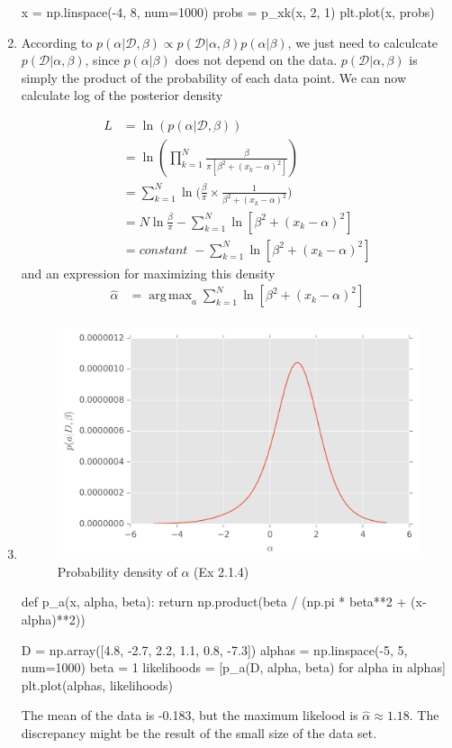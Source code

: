 \documentclass{article}
\DeclareMathOperator*{\argmax}{arg\,max}
\begin{document}
\begin{enumerate}
\begin{python}
x = np.linspace(-4, 8, num=1000)
probs = p_xk(x, 2, 1)
plt.plot(x, probs)
\end{python}
\item 
According to $p(\alpha | \mathcal{D}, \beta) \propto p(\mathcal{D} | \alpha, \beta)p(\alpha|\beta)$, we just need to calculcate  $p(\mathcal{D} | \alpha, \beta)$, since $p(\alpha|\beta)$ does not depend on the data. $p(\mathcal{D} | \alpha, \beta)$ is simply the product of the probability of each data point. We can now calculate log of the posterior density 

\begin{align*}
L &= \ln(p(\alpha | \mathcal{D}, \beta)) \\
&= \ln(\prod_{k=1}^N \frac{\beta}{\pi[\beta^2+(x_k - \alpha)^2]}) \\
&= \sum_{k=1}^N \ln\bigg(\frac{\beta}{\pi}\times\frac{1}{\beta^2+(x_k - \alpha)^2}\bigg) \\
&= N\ln\frac{\beta}{\pi} - \sum_{k=1}^N \ln[\beta^2+(x_k - \alpha)^2] \\
&= \textit{constant } - \sum_{k=1}^N \ln[\beta^2+(x_k - \alpha)^2]
\end{align*}
and an expression for maximizing this density
\begin{align*}
\hat{\alpha} &= \argmax_a \sum_{k=1}^N \ln[\beta^2+(x_k - \alpha)^2]\\
\end{align*}
\item 
\begin{figure}[H]
\centering
\includegraphics[width=.6\textwidth]{images/prob_a.png}
\caption{Probability density of $\alpha$ (Ex 2.1.4)}
\end{figure}
\begin{python}
def p_a(x, alpha, beta):
    return np.product(beta / (np.pi * beta**2 + (x-alpha)**2))

D = np.array([4.8, -2.7, 2.2, 1.1, 0.8, -7.3])
alphas = np.linspace(-5, 5, num=1000)
beta = 1
likelihoods = [p_a(D, alpha, beta) for alpha in alphas]
plt.plot(alphas, likelihoods)
\end{python}
The mean of the data is -0.183, but the maximum likelood is $\hat{\alpha}\approx 1.18$. The discrepancy might be the result of the small size of the data set.
\end{enumerate}
\end{document}
